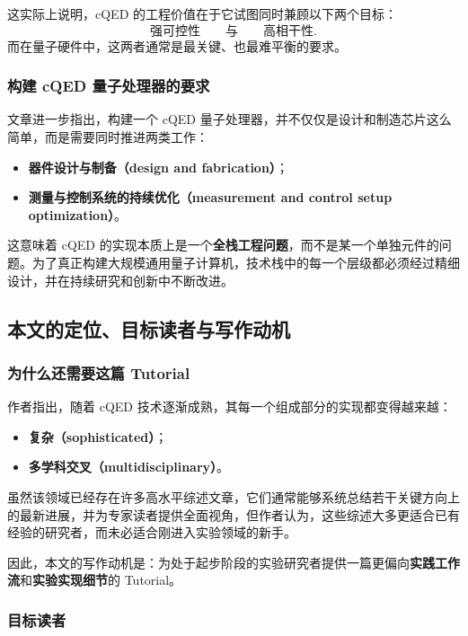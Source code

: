 \documentclass[12pt,a4paper,oneside]{ctexbook}
\begin{document}
这实际上说明，cQED 的工程价值在于它试图同时兼顾以下两个目标：
\[
\text{强可控性} \qquad \text{与} \qquad \text{高相干性}.
\]
而在量子硬件中，这两者通常是最关键、也最难平衡的要求。

\subsubsection{构建 cQED 量子处理器的要求}

文章进一步指出，构建一个 cQED 量子处理器，并不仅仅是设计和制造芯片这么简单，而是需要同时推进两类工作：
\begin{itemize}[leftmargin=2em]
    \item \textbf{器件设计与制备（design and fabrication）}；
    \item \textbf{测量与控制系统的持续优化（measurement and control setup optimization）}。
\end{itemize}

这意味着 cQED 的实现本质上是一个\textbf{全栈工程问题}，而不是某一个单独元件的问题。为了真正构建大规模通用量子计算机，技术栈中的每一个层级都必须经过精细设计，并在持续研究和创新中不断改进。

\subsection{本文的定位、目标读者与写作动机}

\subsubsection{为什么还需要这篇 Tutorial}

作者指出，随着 cQED 技术逐渐成熟，其每一个组成部分的实现都变得越来越：
\begin{itemize}[leftmargin=2em]
    \item \textbf{复杂（sophisticated）}；
    \item \textbf{多学科交叉（multidisciplinary）}。
\end{itemize}

虽然该领域已经存在许多高水平综述文章，它们通常能够系统总结若干关键方向上的最新进展，并为专家读者提供全面视角，但作者认为，这些综述大多更适合已有经验的研究者，而未必适合刚进入实验领域的新手。

因此，本文的写作动机是：为处于起步阶段的实验研究者提供一篇更偏向\textbf{实践工作流}和\textbf{实验实现细节}的 Tutorial。

\subsubsection{目标读者}
\end{document}
